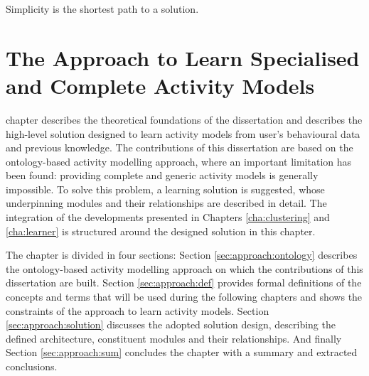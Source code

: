 

\begin{savequote}[50mm]
Simplicity is the shortest path to a solution.
\end{savequote}


\chapter{The Approach to Learn Specialised and Complete Activity Models}
\label{cha:archi}

\ifpdf
    \graphicspath{{3_approach_to_learning_eam/figures/PDF/}{3_approach_to_learning_eam/figures/PNG/}{3_approach_to_learning_eam/figures/}}
\else
    \graphicspath{{3_approach_to_learning_eam/figures/EPS/}{3_approach_to_learning_eam/figures/}}
\fi

 chapter describes the theoretical foundations of the dissertation and describes the high-level solution designed to learn activity models from user's behavioural data and previous knowledge. The contributions of this dissertation are based on the ontology-based activity modelling approach, where an important limitation has been found: providing complete and generic activity models is generally impossible. To solve this problem, a learning solution is suggested, whose underpinning modules and their relationships are described in detail. The integration of the developments presented in Chapters \ref{cha:clustering} and \ref{cha:learner} is structured around the designed solution in this chapter.


The chapter is divided in four sections: Section \ref{sec:approach:ontology} describes the ontology-based activity modelling approach on which the contributions of this dissertation are built. Section \ref{sec:approach:def} provides formal definitions of the concepts and terms that will be used during the following chapters and shows the constraints of the approach to learn activity models. Section \ref{sec:approach:solution} discusses the adopted solution design, describing the defined architecture, constituent modules and their relationships. And finally Section \ref{sec:approach:sum} concludes the chapter with a summary and extracted conclusions.